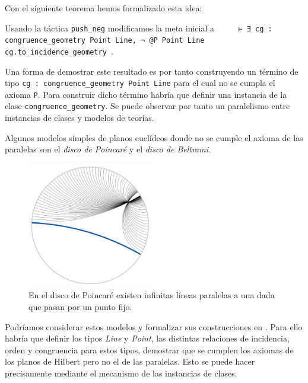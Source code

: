 Con el siguiente teorema hemos formalizado esta idea:


Usando la táctica \lstinline{push_neg} modificamos la meta inicial a
\lstinline{
	⊢ ∃ cg : congruence_geometry Point Line, ¬ @P Point Line cg.to_incidence_geometry
}.


Una forma de demostrar este resultado es por tanto construyendo un término de
tipo \lstinline{cg : congruence_geometry Point Line} para el cual no se cumpla
el axioma \lstinline{P}.
Para construir dicho término habría que definir una instancia de la clase
\lstinline{congruence_geometry}. Se puede observar por tanto un paralelismo
entre instancias de clases y modelos de teorías.

Algunos modelos simples de planos euclídeos donde no se cumple el axioma de las
paralelas son el \textit{disco de Poincaré} y el \textit{disco de Beltrami}.

\begin{figure}[htbp]
	\centerline{\includegraphics[width=5.5cm]{./imgs/Poincare_disc_hyperbolic_parallel_lines.png}}
	\caption*{En el disco de Poincaré existen infinitas líneas paralelas a una
		dada que pasan por un punto fijo.}
	\label{figure:poincare}
\end{figure}

Podríamos considerar estos modelos y formalizar sus construcciones en \textit{}.
Para ello habría que definir los tipos \textit{Line} y \textit{Point}, las
distintas relaciones de incidencia, orden y congruencia para estos tipos,
demostrar que se cumplen los axiomas de los planos de Hilbert pero no el de las
paralelas. Esto se puede hacer precisamente mediante el mecanismo de las
instancias de clases.







